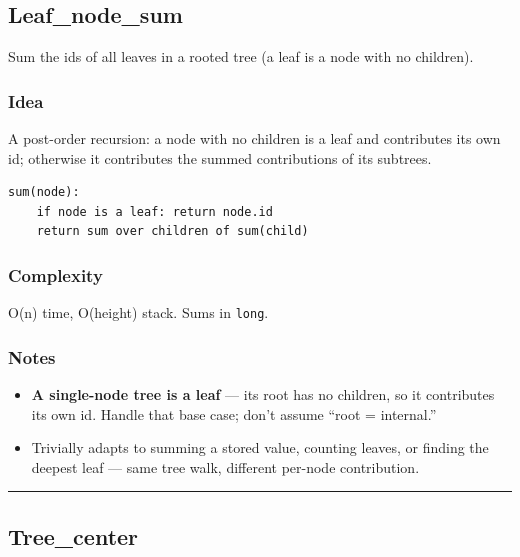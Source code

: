 \documentclass[
  10pt,
  letterpaper,
  onecolumn]{article}
\providecommand{\tightlist}{%
  \setlength{\itemsep}{0pt}\setlength{\parskip}{0pt}}
\begin{document}
\hypertarget{leaf_node_sum}{%
\subsection{Leaf\_node\_sum}\label{leaf_node_sum}}

Sum the ids of all leaves in a rooted tree (a leaf is a node with no
children).

\hypertarget{idea-10}{%
\subsubsection{Idea}\label{idea-10}}

A post-order recursion: a node with no children is a leaf and
contributes its own id; otherwise it contributes the summed
contributions of its subtrees.

\begin{verbatim}
sum(node):
    if node is a leaf: return node.id
    return sum over children of sum(child)
\end{verbatim}

\hypertarget{complexity-10}{%
\subsubsection{Complexity}\label{complexity-10}}

O(n) time, O(height) stack. Sums in \texttt{long}.

\hypertarget{notes-9}{%
\subsubsection{Notes}\label{notes-9}}

\begin{itemize}
\tightlist
\item
  \textbf{A single-node tree is a leaf} --- its root has no children, so
  it contributes its own id. Handle that base case; don't assume ``root
  = internal.''
\item
  Trivially adapts to summing a stored value, counting leaves, or
  finding the deepest leaf --- same tree walk, different per-node
  contribution.
\end{itemize}

\begin{center}\rule{0.5\linewidth}{0.5pt}\end{center}

\hypertarget{tree_center}{%
\subsection{Tree\_center}\label{tree_center}}
\end{document}
